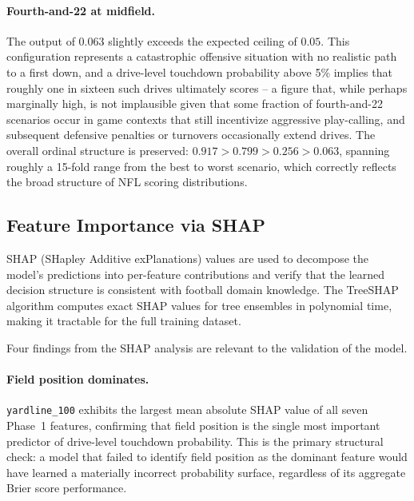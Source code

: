 \paragraph{Fourth-and-22 at midfield.}
The output of 0.063 slightly exceeds the expected ceiling of $0.05$. This
configuration represents a catastrophic offensive situation with no realistic
path to a first down, and a drive-level touchdown probability above 5\% implies
that roughly one in sixteen such drives ultimately scores -- a figure that,
while perhaps marginally high, is not implausible given that some fraction of
fourth-and-22 scenarios occur in game contexts that still incentivize
aggressive play-calling, and subsequent defensive penalties or turnovers
occasionally extend drives. The overall ordinal structure is preserved:
$0.917 > 0.799 > 0.256 > 0.063$, spanning roughly a 15-fold range from the
best to worst scenario, which correctly reflects the broad structure of NFL
scoring distributions.

\subsection{Feature Importance via SHAP}
\label{sec:shap-results}

SHAP (SHapley Additive exPlanations) values \parencite{lundberg2017shap} are
used to decompose the model's predictions into per-feature contributions and
verify that the learned decision structure is consistent with football
domain knowledge. The TreeSHAP algorithm \parencite{lundberg2017shap} computes
exact SHAP values for tree ensembles in polynomial time, making it tractable
for the full training dataset.

Four findings from the SHAP analysis are relevant to the validation of
the \xscore{} model.

\paragraph{Field position dominates.}
\texttt{yardline\_100} exhibits the largest mean absolute SHAP value of all
seven Phase~1 features, confirming that field position is the single most
important predictor of drive-level touchdown probability. This is the
primary structural check: a model that failed to identify field position as
the dominant feature would have learned a materially incorrect probability
surface, regardless of its aggregate Brier score performance.

